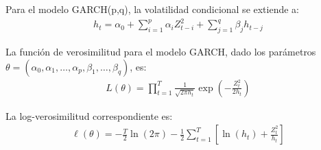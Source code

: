 Para el modelo GARCH(p,q), la volatilidad condicional se extiende a:
\begin{align*}
    h_t = \alpha_0 + \sum_{i=1}^{p} \alpha_i Z_{t-i}^2 + \sum_{j=1}^{q} \beta_j h_{t-j}
\end{align*}

La función de verosimilitud para el modelo GARCH, dado los parámetros $\theta = (\alpha_0, \alpha_1, \ldots, \alpha_p, \beta_1, \ldots, \beta_q)$, es:
\begin{align*}
    L(\theta) = \prod_{t=1}^{T} \frac{1}{\sqrt{2\pi h_t}} \exp\left(-\frac{Z_t^2}{2h_t}\right)
\end{align*}

La log-verosimilitud correspondiente es:
\begin{align*}
    \ell(\theta) = -\frac{T}{2}\ln(2\pi) - \frac{1}{2}\sum_{t=1}^{T}\left[\ln(h_t) + \frac{Z_t^2}{h_t}\right]
\end{align*} 